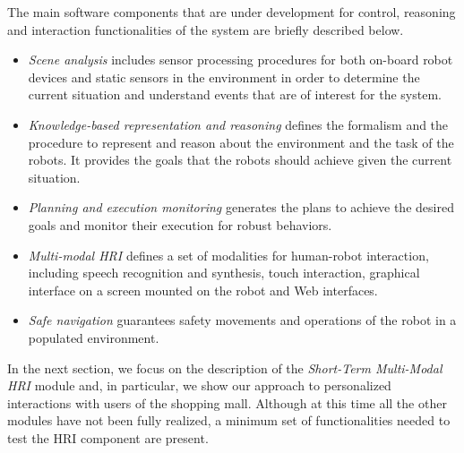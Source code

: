 The main software components that are under development for control, reasoning and interaction functionalities of the system are briefly described below.

\vspace{-1em}
\begin{itemize}
\item \emph{Scene analysis} includes sensor processing procedures for both on-board robot devices and static sensors in the environment in order to determine the current situation and understand events that are of interest for the system.
\item \emph{Knowledge-based representation and reasoning} defines the formalism and the procedure to represent and reason about the environment and the task of the robots. It provides the goals that the robots should achieve given the current situation.
\item \emph{Planning and execution monitoring} generates the plans to achieve the desired goals and monitor their execution for robust behaviors.
\item \emph{Multi-modal HRI} defines a set of modalities for human-robot interaction, including speech recognition and synthesis, touch interaction, graphical interface on a screen mounted on the robot and Web interfaces.
\item \emph{Safe navigation} guarantees safety movements and operations of the robot in a populated environment.
\end{itemize}

In the next section, we focus on the description of the \emph{Short-Term Multi-Modal HRI} module and, in particular, we show our approach to personalized interactions with users of the shopping mall.
Although at this time all the other modules have not been fully realized, a minimum set of functionalities needed to test the HRI component are present.

